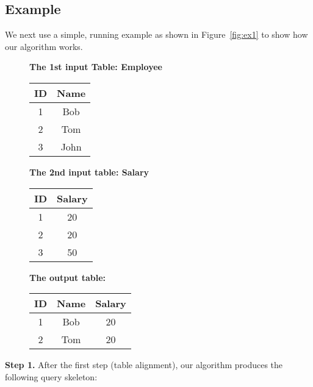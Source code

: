 \subsection{Example}
\label{sec:ex}

We next use a simple, running example as shown in Figure~\ref{fig:ex1} to
show how our algorithm works.


\begin{figure}[t]

\textbf{The 1st input Table: Employee}

\begin{tabular}{|c|c|}
\hline
 ID & Name \\
 \hline
 \hline
 1 &  Bob \\
\hline
 2 &  Tom \\
\hline
 3 &  John \\
\hline
\end{tabular}

\vspace{2mm}

\textbf{The 2nd input table: Salary}

\begin{tabular}{|c|c|}
\hline
 ID & Salary \\
 \hline
 \hline
 1&  20 \\
\hline
 2&  20\\
\hline
 3&  50\\
\hline
\end{tabular}


\vspace{3mm}

\textbf{The output table:}

\begin{tabular}{|c|c|c|}
\hline
 ID & Name & Salary \\
\hline
 \hline
 1 & Bob & 20 \\
 \hline
 2 & Tom & 20 \\
 \hline
\end{tabular}
 \vspace{2mm}
\end{figure}

\vspace{1mm}
\noindent \textbf{Step 1.} After the first step (table alignment), our algorithm produces the following
query skeleton:


